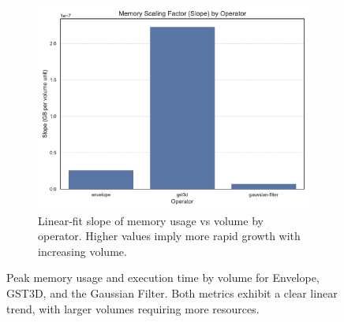 \begin{figure}[htbp]
    \hfill
    \begin{subfigure}[t]{0.49\textwidth}
        \centering
        \includegraphics[width=\textwidth]{assets/images/05/cross_operator_memory_scaling_factor}
        \caption{Linear-fit slope of memory usage vs volume by operator.
        Higher values imply more rapid growth with increasing volume.}
    \end{subfigure}
    \caption{Peak memory usage and execution time by volume for Envelope, \ac{GST3D}, and the Gaussian Filter.
    Both metrics exhibit a clear linear trend, with larger volumes requiring more resources.}
    \label{fig:ex_peak_mu_facet}
\end{figure}

